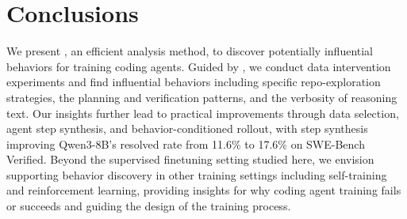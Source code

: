 


\section{Conclusions}
We present \toolName, an efficient analysis method, to discover potentially influential behaviors for training coding agents.
Guided by \toolName, we conduct data intervention experiments and find influential behaviors including specific repo-exploration strategies, the planning and verification patterns, and the verbosity of reasoning text.
Our insights further lead to practical improvements through data selection, agent step synthesis, and behavior-conditioned rollout, with step synthesis improving Qwen3-8B’s resolved rate from 11.6\% to 17.6\% on SWE-Bench Verified. 
Beyond the supervised finetuning setting studied here, we envision \toolName supporting behavior discovery in other training settings including self-training and reinforcement learning, providing insights for why coding agent training fails or succeeds and guiding the design of the training process.
